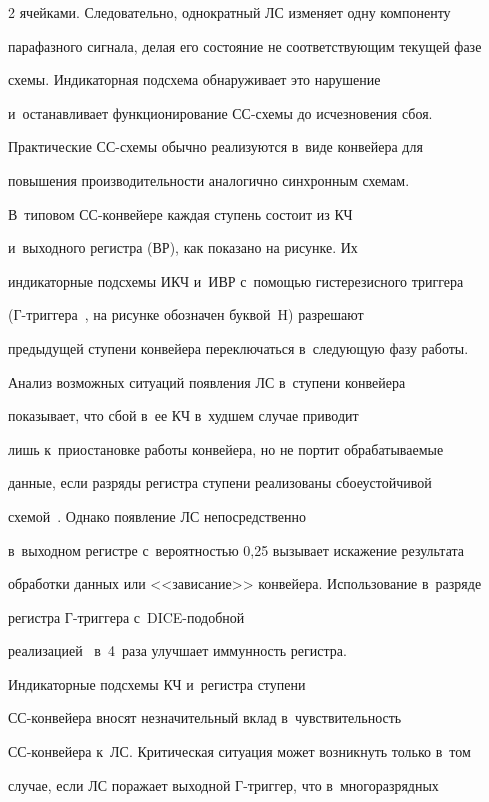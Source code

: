 \begin{multicols}{2}
ячейками. Следовательно, однократный ЛС изменяет одну компоненту 

парафазного сигнала, делая его состояние не соответствующим текущей фазе 

схемы. Индикаторная подсхема обнаруживает это нарушение 

и~оста\-нав\-ли\-ва\-ет функционирование СС-схе\-мы до исчезновения сбоя.

  

  Практические СС-схе\-мы обычно реализуются в~виде конвейера для 

повышения про\-из\-во\-ди\-тель\-ности аналогично синхронным схемам. 

В~типовом СС-кон\-вей\-ере каждая ступень состоит из КЧ 

и~выходного регистра (ВР), как показано на рисунке. Их 

индикаторные подсхемы ИКЧ и~ИВР с~помощью гистерезисного триггера  

(Г-триг\-ге\-ра~\cite{9-step}, на рисунке обозначен буквой~H) разрешают 

предыдущей ступени конвейера переключаться в~следующую фазу работы.

  

  Анализ возможных ситуаций появления ЛС в~ступени конвейера 

показывает, что сбой в~ее КЧ в~худшем случае приводит 

лишь к~приостановке работы конвейера, но не портит обрабатываемые 

данные, если разряды регистра ступени реализованы сбоеустойчивой 

схемой~\cite[Fig.~10]{16-step}. Однако появление ЛС непосредственно 

в~выходном регистре с~вероятностью 0,25 вызывает искажение результата 

обработки данных или <<зависание>> конвейера. Использование в~разряде 

регистра \mbox{Г-триг}\-ге\-ра с~DICE-по\-доб\-ной  

реализацией~\cite[Fig.~12]{16-step} в~4~раза улучшает иммунность регистра.

  

Индикаторные подсхемы КЧ и~регистра ступени  

СС-кон\-вей\-ера вносят незначительный вклад в~чувствительность  

СС-кон\-вей\-ера к~ЛС. Критическая ситуация может возникнуть только в~том 

случае, если ЛС поражает выходной Г-триг\-гер, что в~многоразрядных  


\end{multicols}
